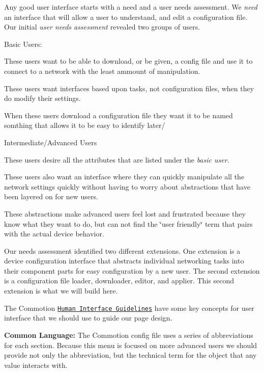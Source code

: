 Any good user interface starts with a need and a user needs assessment. We {\itshape need} an interface that will allow a user to understand, and edit a configuration file. Our initial {\itshape user needs assessment} revealed two groups of users.

Basic Users\+:
\begin{DoxyItemize}
\item These users want to be able to download, or be given, a config file and use it to connect to a network with the least ammount of manipulation.
\item These users want interfaces based upon tasks, not configuration files, when they do modify their settings.
\item When these users download a configuration file they want it to be named somthing that allows it to be easy to identify later/
\end{DoxyItemize}

Intermediate/\+Advanced Users
\begin{DoxyItemize}
\item These users desire all the attributes that are listed under the {\itshape basic user.}
\item These users also want an interface where they can quickly manipulate all the network settings quickly without having to worry about abstractions that have been layered on for new users.
\begin{DoxyItemize}
\item These abstractions make advanced users feel lost and frustrated because they know what they want to do, but can not find the \char`\"{}user friendly\char`\"{} term that pairs with the actual device behavior.
\end{DoxyItemize}
\end{DoxyItemize}

Our needs assessment identified two different extensions. One extension is a device configuration interface that abstracts individual networking tasks into their component parts for easy configuration by a new user. The second extension is a configuration file loader, downloader, editor, and applier. This second extension is what we will build here.

The Commotion \href{http://commotionwireless.net/developer/hig/key-concepts}{\tt Human Interface Guidelines} have some key concepts for user interface that we should use to guide our page design.

{\bfseries Common Language\+:} The Commotion config file uses a series of abbreviations for each section. Because this menu is focused on more advanced users we should provide not only the abbreviation, but the technical term for the object that any value interacts with.

